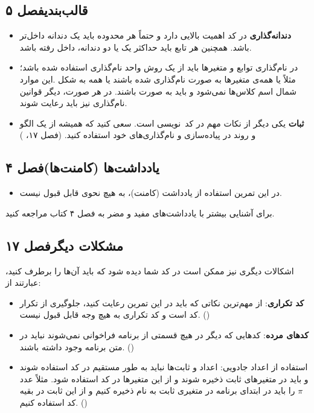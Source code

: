 \documentclass{utap}
\newcommand{\chap}[1]{\hfill\normalfont\normalsize فصل #1}
\begin{document}
\subsection[قالب‌بندی]{قالب‌بندی\chap{۵}}
  \begin{itemize}
        \item
\textbf{دندانه‌گذاری}
در کد اهمیت بالایی دارد و حتماً هر محدوده باید یک دندانه داخل‌تر باشد. همچنین هر تابع باید حداکثر یک یا دو دندانه، داخل رفته باشد.
	\item
در نام‌گذاری توابع و متغیر‌ها باید از یک روش واحد نام‌گذاری استفاده شده باشد؛ مثلاً یا همه‌ی متغیر‌ها به صورت  نام‌گذاری شده باشند یا همه به شکل .این موارد شمال اسم کلاس‌ها نمی‌شود و باید به صورت  باشند.  در هر صورت، دیگر قوانین نام‌گذاری نیز باید رعایت شوند.
    \item
\textbf{ثبات} یکی دیگر از نکات مهم در کد~نویسی است. سعی کنید که همیشه از یک الگو و روند در پیاده‌سازی و نام‌گذاری‌های خود استفاده کنید. (فصل ۱۷، )
    \end{itemize}

\subsection[یادداشت‌ها]{یادداشت‌ها (کامنت‌ها)\chap{۴}}
	  \begin{itemize}
	        \item
در این تمرین استفاده از یادداشت (کامنت)، به هیچ نحوی قابل قبول نیست.
	    \end{itemize}
برای آشنایی بیشتر با یادداشت‌های مفید و مضر به فصل ۴ کتاب مراجعه کنید.

\subsection[مشکلات دیگر]{مشکلات دیگر\chap{۱۷}}
اشکالات دیگری نیز ممکن است در کد شما دیده شود که باید آن‌ها را برطرف کنید، عبارتند از:
	  \begin{itemize}
        \item \textbf{کد تکراری}:
از مهم‌ترین نکاتی که باید در این تمرین رعایت کنید، جلوگیری از تکرار کد است و کد تکراری به هیچ وجه قابل قبول نیست. ()
		\item \textbf{کدهای مرده}:
کدهایی که دیگر در هیچ قسمتی از برنامه فراخوانی نمی‌شوند نباید در متن برنامه وجود داشته باشند. ()
		\item استفاده از اعداد جادویی:
اعداد و ثابت‌ها نباید به طور مستقیم در کد استفاده شوند و باید در متغیر‌های ثابت ذخیره شوند و از این متغیر‌ها در کد استفاده شود. مثلاً عدد $\pi$ را باید در ابتدای برنامه در متغیری ثابت به نام  ذخیره کنیم و از این ثابت در بقیه کد استفاده کنیم. ()
	   \end{itemize}
\end{document}
